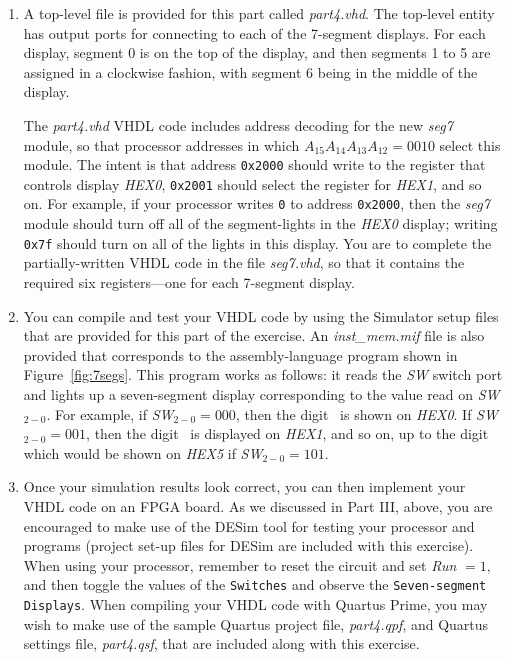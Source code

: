 \documentclass[epsfig,10pt,fullpage]{article} \addtolength{\textwidth}{1.5in}
\newcommand{\red}[1]{{\color{red}\sf{#1}}}
\begin{document}
\begin{enumerate}
\item A top-level file is provided for this part
called {\it part4.vhd}. The top-level entity has output ports for connecting
to each of the 7-segment displays. 
For each display, segment 0 is on the top of the display, and then segments 1 to 5 are assigned
in a clockwise fashion, with segment 6 being in the middle of the display.

The {\it part4.vhd} VHDL code includes address decoding for the new {\it seg7} module, 
so that processor addresses in which $A_{15} A_{14} A_{13} A_{12} = 0010$ select this module.
The intent is that address \texttt{0x2000} should write to the register that controls 
display {\it HEX0}, \texttt{0x2001} should select the register for {\it HEX1}, and 
so on. For example, if your processor 
writes \texttt{0} to address \texttt{0x2000}, then the {\it seg7} module
should turn off all of the segment-lights in the {\it HEX0} display; writing \texttt{0x7f} 
should turn on all of the lights in this display. 
You are to complete the partially-written VHDL code in the file {\it seg7.vhd}, so that
it contains the required six registers---one for each 7-segment display. 
        
\item You can compile and test your VHDL code by using the Simulator setup files that 
are provided for this part of the exercise. An {\it inst\_mem.mif} file is also provided
that corresponds to the assembly-language program shown in 
Figure~\ref{fig:7segs}. This program works as follows: it reads the {\it SW} switch port and 
lights up a seven-segment display corresponding to the value read on {\it SW}$_{2-0}$. For
example, if {\it SW}$_{2-0} = 000$, then the digit~\texttt{\red{0}} is shown on {\it HEX0}.
If {\it SW}$_{2-0} = 001$, then the digit~\texttt{\red{1}} is displayed on {\it HEX1}, 
and so on, up to the digit~\texttt{\red{5}} which would be shown on {\it HEX5} if
{\it SW}$_{2-0} = 101$.

\item Once your simulation results look correct, you can then implement your VHDL
code on an FPGA board. As we discussed in Part III, above, you are encouraged 
to make use of the DESim tool for testing your processor and
programs (project set-up files for DESim are included with this exercise). 
When using your processor, remember to reset the circuit and set {\it Run} $= 1$, and then 
toggle the values of the \texttt{Switches} and 
observe the \texttt{Seven-segment Displays}. When compiling your VHDL code with
Quartus Prime, you may wish to make use of the sample Quartus project file, {\it part4.qpf}, 
and Quartus settings file, {\it part4.qsf}, that are included along with this exercise.
\end{enumerate}
\end{document}
